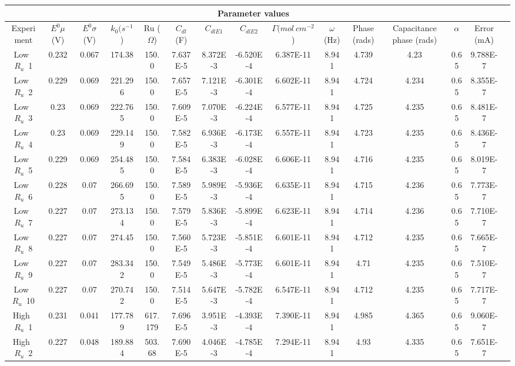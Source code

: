 \documentclass[preview]{standalone}
\begin{document}
\begin{center}
\begin{tabular}{|c|c|c|c|c|c|c|c|c|c|c|c|c|c|c|}
\hline
\multicolumn{14}{|c|}{Parameter values}\\ 
\hline
Experiment & $E^0 \mu$ (V) & $E^0 \sigma$ (V) & $k_0 (s^{-1}$) & Ru ($\Omega$) & $C_{dl}$ (F) & $C_{dlE1}$ & $C_{dlE2}$ & $\Gamma (mol\:cm^{-2}$) & $\omega$ (Hz) & Phase (rads) & Capacitance phase (rads) & $\alpha$ & Error (mA)\\
\hline
Low\ $R_u$\ 1 & 0.232 & 0.067 & 174.38 & 150.0 & 7.637E-5 & 8.372E-3 & -6.520E-4 & 6.387E-11 & 8.941 & 4.739 & 4.23 & 0.65 & 9.788E-7\\
\hline
Low\ $R_u$\ 2 & 0.229 & 0.069 & 221.296 & 150.0 & 7.657E-5 & 7.121E-3 & -6.301E-4 & 6.602E-11 & 8.941 & 4.724 & 4.234 & 0.65 & 8.355E-7\\
\hline
Low\ $R_u$\ 3 & 0.23 & 0.069 & 222.765 & 150.0 & 7.609E-5 & 7.070E-3 & -6.224E-4 & 6.577E-11 & 8.941 & 4.725 & 4.235 & 0.65 & 8.481E-7\\
\hline
Low\ $R_u$\ 4 & 0.23 & 0.069 & 229.149 & 150.0 & 7.582E-5 & 6.936E-3 & -6.173E-4 & 6.557E-11 & 8.941 & 4.723 & 4.235 & 0.65 & 8.436E-7\\
\hline
Low\ $R_u$\ 5 & 0.229 & 0.069 & 254.485 & 150.0 & 7.584E-5 & 6.383E-3 & -6.028E-4 & 6.606E-11 & 8.941 & 4.716 & 4.235 & 0.65 & 8.019E-7\\
\hline
Low\ $R_u$\ 6 & 0.228 & 0.07 & 266.695 & 150.0 & 7.589E-5 & 5.989E-3 & -5.936E-4 & 6.635E-11 & 8.941 & 4.715 & 4.236 & 0.65 & 7.773E-7\\
\hline
Low\ $R_u$\ 7 & 0.227 & 0.07 & 273.134 & 150.0 & 7.579E-5 & 5.836E-3 & -5.899E-4 & 6.623E-11 & 8.941 & 4.714 & 4.236 & 0.65 & 7.710E-7\\
\hline
Low\ $R_u$\ 8 & 0.227 & 0.07 & 274.45 & 150.0 & 7.560E-5 & 5.723E-3 & -5.851E-4 & 6.601E-11 & 8.941 & 4.712 & 4.235 & 0.65 & 7.665E-7\\
\hline
Low\ $R_u$\ 9 & 0.227 & 0.07 & 283.342 & 150.0 & 7.549E-5 & 5.486E-3 & -5.773E-4 & 6.601E-11 & 8.941 & 4.71 & 4.235 & 0.65 & 7.510E-7\\
\hline
Low\ $R_u$\ 10 & 0.227 & 0.07 & 270.742 & 150.0 & 7.514E-5 & 5.647E-3 & -5.782E-4 & 6.547E-11 & 8.941 & 4.712 & 4.235 & 0.65 & 7.717E-7\\
\hline
High\ $R_u$\ 1 & 0.231 & 0.041 & 177.789 & 617.179 & 7.696E-5 & 3.951E-3 & -4.393E-4 & 7.390E-11 & 8.941 & 4.985 & 4.365 & 0.65 & 9.060E-7\\
\hline
High\ $R_u$\ 2 & 0.227 & 0.048 & 189.884 & 503.68 & 7.690E-5 & 4.046E-3 & -4.785E-4 & 7.294E-11 & 8.941 & 4.93 & 4.335 & 0.65 & 7.651E-7\\

\end{tabular}
\end{center}
\end{document}

